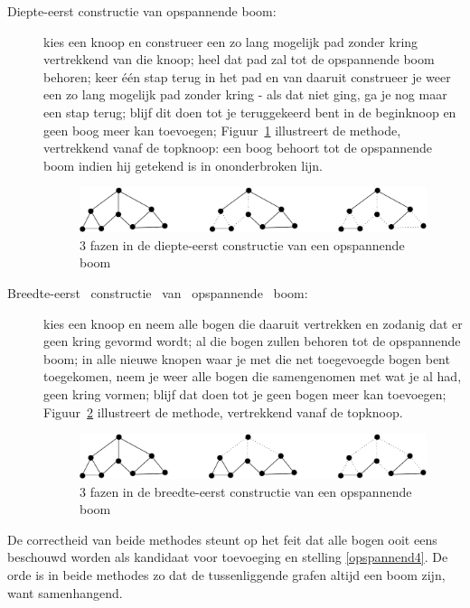 \begin{description}
\item[Diepte-eerst constructie van opspannende boom:] kies een knoop
en construeer een zo lang mogelijk pad zonder kring vertrekkend van
die knoop; heel dat pad zal tot de opspannende boom behoren; keer
\'{e}\'{e}n stap terug in het pad en van daaruit construeer je weer
een zo lang mogelijk pad zonder kring - als dat niet ging, ga je nog
maar een stap terug; blijf dit doen tot je teruggekeerd bent in de
beginknoop en geen boog meer kan toevoegen; Figuur~\ref{diepteeerst1}
illustreert de methode, vertrekkend vanaf de topknoop: 
een boog behoort tot de opspannende boom indien hij getekend is in ononderbroken lijn.
\begin{figure}[ht]
\begin{center}
\includegraphics[width=0.6\linewidth,keepaspectratio]{diepteeerst1}
\end{center}
\caption{3 fazen in de diepte-eerst constructie van een opspannende boom \label{diepteeerst1}}
\end{figure}

\item[Breedte-eerst \ constructie \ van \ opspannende \ boom:] 
kies een knoop en 
neem alle bogen die daaruit vertrekken en zodanig
dat er geen kring gevormd wordt; al die bogen zullen behoren tot de
opspannende boom; in alle nieuwe knopen waar je met die net
toegevoegde bogen bent toegekomen, neem je weer alle bogen die
samengenomen met wat je al had, geen kring vormen; blijf dat doen tot
je geen bogen meer kan toevoegen; Figuur~\ref{breedteeerst1}
illustreert de methode, vertrekkend vanaf de topknoop.

\begin{figure}[ht]
\begin{center}
\includegraphics[width=0.6\linewidth,keepaspectratio]{breedteeerst1}
\end{center}
\caption{3 fazen in de breedte-eerst constructie van een opspannende boom \label{breedteeerst1}}
\end{figure}
\end{description}

De correctheid van beide methodes steunt op het feit dat alle bogen
ooit eens beschouwd worden als kandidaat voor toevoeging en stelling
\ref{opspannend4}. De orde is in beide methodes zo dat de
tussenliggende grafen altijd een boom zijn, want samenhangend.


